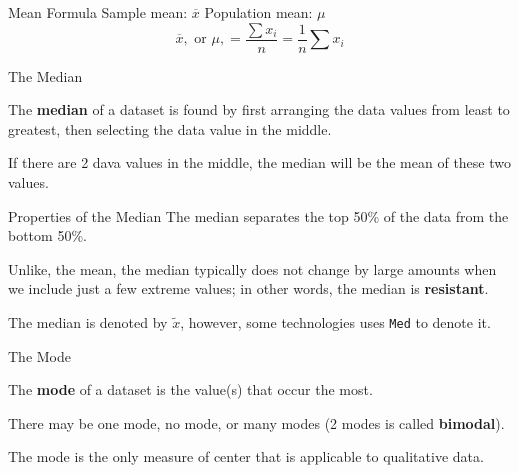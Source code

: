 \documentclass[t]{beamer}
\begin{document}
\begin{frame}{Mean Formula}
Sample mean: $\overline{x}$	\qquad	Population mean: $\mu$	\newline\\	\pause
\[ \overline{x}, \text{ or } \mu, = \frac{\sum x_i}{n} = \frac{1}{n}\sum x_i	\]
\end{frame}

\begin{frame}{The Median}

\begin{tcolorbox}[colframe=green!20!black, colback = green!30!white,title=\textbf{Median}]
The \textbf{median} of a dataset is found by first arranging the data values from least to greatest, then selecting the data value in the middle. 
\end{tcolorbox}
\vspace{11pt}	\pause

If there are 2 dava values in the middle, the median will be the mean of these two values.
\end{frame}

\begin{frame}{Properties of the Median}
The median separates the top 50\% of the data from the bottom 50\%.	\newline\\	\pause

Unlike, the mean, the median typically does not change by large amounts when we include just a few extreme values; in other words, the median is \textbf{resistant}.	\newline\\	\pause

The median is denoted by $\tilde{x}$, however, some technologies uses \texttt{Med} to denote it.
\end{frame}

\begin{frame}{The Mode}

\begin{tcolorbox}[colframe=green!20!black, colback = green!30!white,title=\textbf{Mode}]
The \textbf{mode} of a dataset is the value(s) that occur the most.
\end{tcolorbox}
\vspace{11pt}	\pause

There may be one mode, no mode, or many modes (2 modes is called \textbf{bimodal}).	\newline\\	\pause

The mode is the only measure of center that is applicable to qualitative data.
\end{frame}
\end{document}
